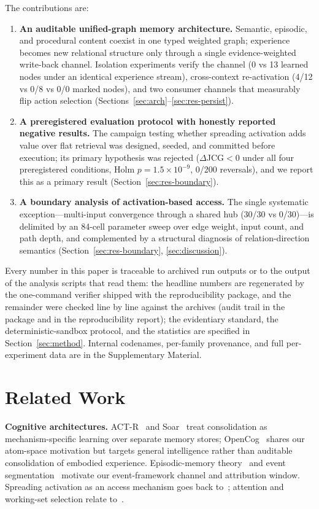 \documentclass[10pt,a4paper]{article}
\begin{document}
The contributions are:
\begin{enumerate}
\item \textbf{An auditable unified-graph memory architecture.} Semantic, episodic, and procedural content coexist in one typed weighted graph; experience becomes new relational structure only through a single evidence-weighted write-back channel. Isolation experiments verify the channel (0 vs 13 learned nodes under an identical experience stream), cross-context re-activation (4/12 vs 0/8 vs 0/0 marked nodes), and two consumer channels that measurably flip action selection (Sections~\ref{sec:arch}--\ref{sec:res-persist}).
\item \textbf{A preregistered evaluation protocol with honestly reported negative results.} The campaign testing whether spreading activation adds value over flat retrieval was designed, seeded, and committed before execution; its primary hypothesis was rejected ($\Delta$JCG${<}0$ under all four preregistered conditions, Holm $p{=}1.5\times10^{-9}$, 0/200 reversals), and we report this as a primary result (Section~\ref{sec:res-boundary}).
\item \textbf{A boundary analysis of activation-based access.} The single systematic exception---multi-input convergence through a shared hub (30/30 vs 0/30)---is delimited by an 84-cell parameter sweep over edge weight, input count, and path depth, and complemented by a structural diagnosis of relation-direction semantics (Section~\ref{sec:res-boundary}, \ref{sec:discussion}).
\end{enumerate}

Every number in this paper is traceable to archived run outputs or to the output of the analysis scripts that read them: the headline numbers are regenerated by the one-command verifier shipped with the reproducibility package, and the remainder were checked line by line against the archives (audit trail in the package and in the reproducibility report); the evidentiary standard, the deterministic-sandbox protocol, and the statistics are specified in Section~\ref{sec:method}. Internal codenames, per-family provenance, and full per-experiment data are in the Supplementary Material.

\section{Related Work}
\label{sec:related}

\textbf{Cognitive architectures.} ACT-R~\citep{anderson2004integrated} and Soar~\citep{laird2012soar} treat consolidation as mechanism-specific learning over separate memory stores; OpenCog~\citep{hart2008opencog} shares our atom-space motivation but targets general intelligence rather than auditable consolidation of embodied experience. Episodic-memory theory~\citep{tulving1983elements,baddeley2000episodic} and event segmentation~\citep{zacks2007event,schacter2007remembering} motivate our event-framework channel and attribution window. Spreading activation as an access mechanism goes back to~\citet{collins1975spreading}; attention and working-set selection relate to~\citet{itti2001computational,posner1980orienting,cowan2001magical}.
\end{document}
